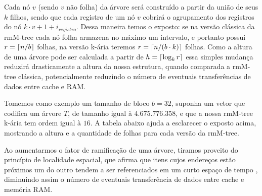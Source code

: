 Cada nó $v$ (sendo $v$ não folha) da árvore será construído a partir da união de seus $k$ filhos, sendo que cada registro de um nó $v$ cobrirá o agrupamento dos registros do nó $k \cdot v +1 + i_{registro}$. 
Dessa maneira temos o exposto: se na versão clássica  da rmM-tree cada nó folha armazena no máximo um intervalo, e portanto possui $r=\lceil n/b\rceil$ folhas, 
na versão k-ária teremos $r=\lceil n/(b \cdot k)\rceil$ folhas. Como a altura de uma árvore pode ser calculada a partir de $h = \lceil\log_k r\rceil$ essa simples mudança reduzirá drasticamente a altura da nossa estrutura,
quando comparada a rmM-tree clássica,  potencialmente reduzindo o número de eventuais transferências de dados entre cache e RAM.

Tomemos como exemplo um tamanho de bloco $b = 32$, suponha um vetor que codifica um árvore $T$, de tamanho igual à  $4.675.776.358$, e que a nossa rmM-tree k-ária tem ordem igual à $16$. A tabela abaixo ajuda a esclarecer o exposto acima, mostrando a altura e a quantidade de folhas para cada versão da rmM-tree.


\begin{table}[h!]
    \centering
    \caption[Diferentes range min-Max tree sobree um conjunto de dados]{Altua e número de nós folhas para uma rmM-tree binária e k-ária}
    \label{tbl:size}
  \end{table}

 Ao aumentarmos o fator de ramificação de uma árvore, tiramos proveito do princípio de localidade espacial, que afirma que itens cujos endereços estão próximos um do outro tendem a ser referenciados em um curto espaço de tempo \citep{book-computer-architecutre}, diminuindo assim o número de eventuais transferência de dados entre cache e memória RAM.
 
